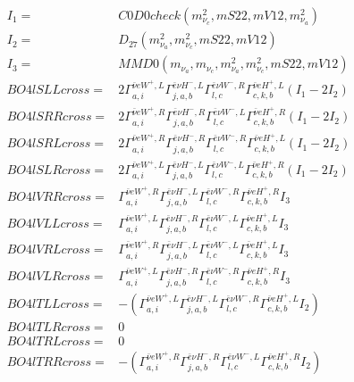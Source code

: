 \documentclass[A4,landscape]{article}
\begin{document}
\begin{align} 
I_1 = & C0D0check(m^2_{\nu_{{c}}}, mS22, mV12, m^2_{\nu_{{a}}}) \\ 
I_2 = & D_{27}(m^2_{\nu_{{a}}}, m^2_{\nu_{{c}}}, mS22, mV12) \\ 
I_3 = & MMD0(m_{\nu_{{a}}}, m_{\nu_{{c}}}, m^2_{\nu_{{a}}}, m^2_{\nu_{{c}}}, mS22, mV12) \\ 
  BO4lSLLcross= & 2  \Gamma^{\bar{\nu}e W^+,L}_{a, i} \Gamma^{\bar{e}\nu H^- ,L}_{j, a, b} \Gamma^{\bar{e}\nu W^- ,R}_{l, c} \Gamma^{\bar{\nu}e H^+,L}_{c, k, b} (I_1 - 2 I_2) \\ 
  BO4lSRRcross= & 2  \Gamma^{\bar{\nu}e W^+,R}_{a, i} \Gamma^{\bar{e}\nu H^- ,R}_{j, a, b} \Gamma^{\bar{e}\nu W^- ,L}_{l, c} \Gamma^{\bar{\nu}e H^+,R}_{c, k, b} (I_1 - 2 I_2) \\ 
  BO4lSRLcross= & 2  \Gamma^{\bar{\nu}e W^+,R}_{a, i} \Gamma^{\bar{e}\nu H^- ,R}_{j, a, b} \Gamma^{\bar{e}\nu W^- ,R}_{l, c} \Gamma^{\bar{\nu}e H^+,L}_{c, k, b} (I_1 - 2 I_2) \\ 
  BO4lSLRcross= & 2  \Gamma^{\bar{\nu}e W^+,L}_{a, i} \Gamma^{\bar{e}\nu H^- ,L}_{j, a, b} \Gamma^{\bar{e}\nu W^- ,L}_{l, c} \Gamma^{\bar{\nu}e H^+,R}_{c, k, b} (I_1 - 2 I_2) \\ 
  BO4lVRRcross= &  \Gamma^{\bar{\nu}e W^+,R}_{a, i} \Gamma^{\bar{e}\nu H^- ,L}_{j, a, b} \Gamma^{\bar{e}\nu W^- ,R}_{l, c} \Gamma^{\bar{\nu}e H^+,R}_{c, k, b} I_3 \\ 
  BO4lVLLcross= &  \Gamma^{\bar{\nu}e W^+,L}_{a, i} \Gamma^{\bar{e}\nu H^- ,R}_{j, a, b} \Gamma^{\bar{e}\nu W^- ,L}_{l, c} \Gamma^{\bar{\nu}e H^+,L}_{c, k, b} I_3 \\ 
  BO4lVRLcross= &  \Gamma^{\bar{\nu}e W^+,R}_{a, i} \Gamma^{\bar{e}\nu H^- ,L}_{j, a, b} \Gamma^{\bar{e}\nu W^- ,L}_{l, c} \Gamma^{\bar{\nu}e H^+,L}_{c, k, b} I_3 \\ 
  BO4lVLRcross= &  \Gamma^{\bar{\nu}e W^+,L}_{a, i} \Gamma^{\bar{e}\nu H^- ,R}_{j, a, b} \Gamma^{\bar{e}\nu W^- ,R}_{l, c} \Gamma^{\bar{\nu}e H^+,R}_{c, k, b} I_3 \\ 
  BO4lTLLcross= & -( \Gamma^{\bar{\nu}e W^+,L}_{a, i} \Gamma^{\bar{e}\nu H^- ,L}_{j, a, b} \Gamma^{\bar{e}\nu W^- ,R}_{l, c} \Gamma^{\bar{\nu}e H^+,L}_{c, k, b} I_2) \\ 
  BO4lTLRcross= & 0 \\ 
  BO4lTRLcross= & 0 \\ 
  BO4lTRRcross= & -( \Gamma^{\bar{\nu}e W^+,R}_{a, i} \Gamma^{\bar{e}\nu H^- ,R}_{j, a, b} \Gamma^{\bar{e}\nu W^- ,L}_{l, c} \Gamma^{\bar{\nu}e H^+,R}_{c, k, b} I_2) \\ 
\end{align} 
\end{document}
